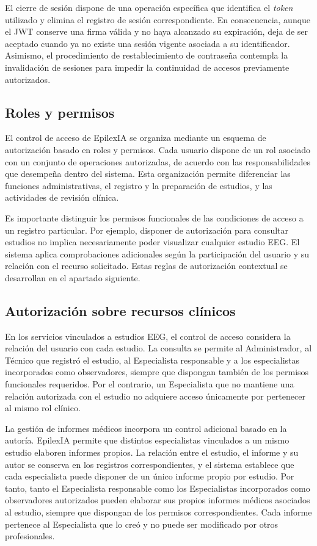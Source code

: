 El cierre de sesión dispone de una operación específica que identifica el \textit{token} utilizado y elimina el registro de sesión correspondiente. En consecuencia, aunque el JWT conserve una firma válida y no haya alcanzado su expiración, deja de ser aceptado cuando ya no existe una sesión vigente asociada a su identificador. Asimismo, el procedimiento de restablecimiento de contraseña contempla la invalidación de sesiones para impedir la continuidad de accesos previamente autorizados.

\subsection{Roles y permisos}
\label{subsec:roles-permisos}

El control de acceso de EpilexIA se organiza mediante un esquema de autorización basado en roles y permisos. Cada usuario dispone de un rol asociado con un conjunto de operaciones autorizadas, de acuerdo con las responsabilidades que desempeña dentro del sistema. Esta organización permite diferenciar las funciones administrativas, el registro y la preparación de estudios, y las actividades de revisión clínica.

Es importante distinguir los permisos funcionales de las condiciones de acceso a un registro particular. Por ejemplo, disponer de autorización para consultar estudios no implica necesariamente poder visualizar cualquier estudio EEG. El sistema aplica comprobaciones adicionales según la participación del usuario y su relación con el recurso solicitado. Estas reglas de autorización contextual se desarrollan en el apartado siguiente.

\subsection{Autorización sobre recursos clínicos}
\label{subsec:autorizacion-recursos-clinicos}

En los servicios vinculados a estudios EEG, el control de acceso considera la relación del usuario con cada estudio. La consulta se permite al Administrador, al Técnico que registró el estudio, al Especialista responsable y a los especialistas incorporados como observadores, siempre que dispongan también de los permisos funcionales requeridos. Por el contrario, un Especialista que no mantiene una relación autorizada con el estudio no adquiere acceso únicamente por pertenecer al mismo rol clínico.

La gestión de informes médicos incorpora un control adicional basado en la autoría. EpilexIA permite que distintos especialistas vinculados a un mismo estudio elaboren informes propios. La relación entre el estudio, el informe y su autor se conserva en los registros correspondientes, y el sistema establece que cada especialista puede disponer de un único informe propio por estudio. Por tanto, tanto el Especialista responsable como los Especialistas incorporados como observadores autorizados pueden elaborar sus propios informes médicos asociados al estudio, siempre que dispongan de los permisos correspondientes. Cada informe pertenece al Especialista que lo creó y no puede ser modificado por otros profesionales.

